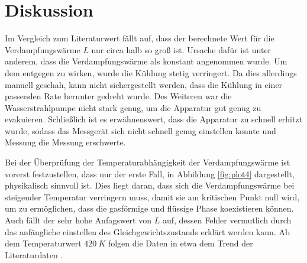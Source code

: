 \section{Diskussion}
\label{sec:Diskussion}

Im Vergleich zum Literaturwert \cite{enthalpy} fällt auf, 
dass der berechnete Wert für die Verdampfungswärme $L$ nur circa halb so groß ist. 
Ursache dafür ist unter anderem, dass die Verdampfungswärme als konstant angenommen wurde. 
Um dem entgegen zu wirken, wurde die Kühlung stetig verringert. 
Da dies allerdings manuell geschah, 
kann nicht sichergestellt werden, dass die Kühlung in einer passenden Rate herunter gedreht wurde. 
Des Weiteren war die Wasserstrahlpumpe nicht stark genug, um die Apparatur gut genug zu evakuieren. 
Schließlich ist es erwähnenswert, dass die Apparatur zu schnell erhitzt wurde, 
sodass das Messgerät sich nicht schnell genug einstellen konnte und Messung die Messung erschwerte.

Bei der Überprüfung der Temperaturabhängigkeit der Verdampfungswärme ist vorerst festzustellen,
dass nur der erste Fall, in Abbildung \ref{fig:plot4} dargestellt, physikalisch sinnvoll ist.
Dies liegt daran, dass sich die Verdampfungswärme bei steigender Temperatur verringern muss, 
damit sie am kritischen Punkt null wird, um zu ermöglichen, dass die gasförmige
und flüssige Phase koexistieren können. 
Auch fällt der sehr hohe Anfagswert von $L$ auf, dessen Fehler vermutlich durch das 
anfängliche einstellen des Gleichgewichtszustands erklärt werden kann.
Ab dem Temperaturwert $\qty{420}{K}$ folgen die Daten in etwa dem Trend der Literaturdaten \cite{enthalpy}.